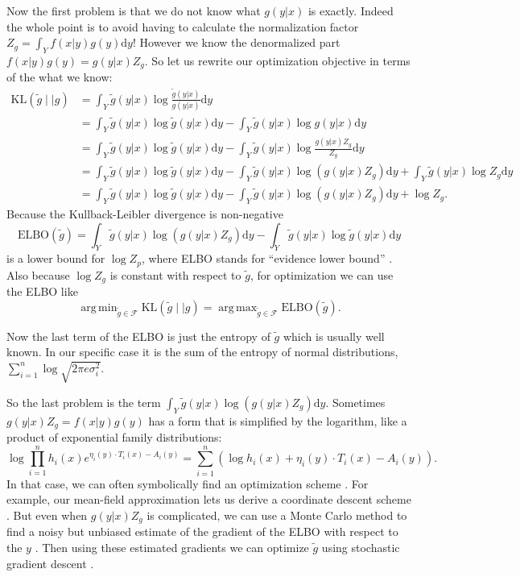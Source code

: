 \documentclass[12pt,vu]{adammath}
\newcommand\kl[2]{{\text{KL}({#1} \mid\mid {#2})}}
\DeclareMathOperator*{\argmin}{arg\,min}
\DeclareMathOperator*{\argmax}{arg\,max}
\theoremstyle{plain}
\theoremstyle{definition}
\theoremstyle{remark}
\begin{document}
Now the first problem is that we do not know what $g(y|x)$ is exactly.
Indeed the whole point is to avoid having to calculate the normalization factor $Z_g = \int_Y f(x|y) g(y) \mathrm{d}y$!
However we know the denormalized part $f(x | y) g(y) = g(y|x) Z_g$.
So let us rewrite our optimization objective in terms of the what we know:
\begin{align*}
  \kl{\tilde{g}}{g} & = \int_Y \tilde{g}(y | x) \log \frac{\tilde{g}(y|x)}{g(y|x)} \mathrm{d}y \\
  &= \int_Y \tilde{g}(y | x) \log \tilde{g}(y|x) \mathrm{d}y - \int_Y \tilde{g}(y | x) \log g(y|x) \mathrm{d}y \\
  &= \int_Y \tilde{g}(y | x) \log \tilde{g}(y|x) \mathrm{d}y - \int_Y \tilde{g}(y | x) \log \frac{g(y|x) Z_g}{Z_g} \mathrm{d}y \\
  &= \int_Y \tilde{g}(y | x) \log \tilde{g}(y|x) \mathrm{d}y - \int_Y \tilde{g}(y | x) \log (g(y|x) Z_g) \mathrm{d}y + \int_Y \tilde{g}(y | x) \log Z_g \mathrm{d}y \\
  &= \int_Y \tilde{g}(y | x) \log \tilde{g}(y|x) \mathrm{d}y - \int_Y \tilde{g}(y | x) \log (g(y|x) Z_g) \mathrm{d}y + \log Z_g.
\end{align*}
Because the Kullback-Leibler divergence is non-negative
$$\text{ELBO}(\tilde{g}) = \int_Y \tilde{g}(y | x) \log (g(y|x) Z_g) \mathrm{d}y - \int_Y \tilde{g}(y | x) \log \tilde{g}(y|x) \mathrm{d}y$$
is a lower bound for $\log Z_p$, where ELBO stands for ``evidence lower bound'' \cite{varinf2016}.
Also because $\log Z_g$ is constant with respect to $\tilde{g}$, for optimization we can use the ELBO like
$$\argmin_{\tilde{g} \in \mathcal{F}} \kl{\tilde{g}}{g} = \argmax_{\tilde{g} \in \mathcal{F}} \text{ELBO}(\tilde{g}).$$

Now the last term of the ELBO is just the entropy of $\tilde{g}$ which is usually well known.
In our specific case it is the sum of the entropy of normal distributions, $\sum_{i=1}^n \log \sqrt{2 \pi e \sigma_i^2}$.

So the last problem is the term $\int_Y \tilde{g}(y | x) \log (g(y|x) Z_g) \mathrm{d}y$.
Sometimes $g(y|x) Z_g = f(x|y) g(y)$ has a form that is simplified by the logarithm, like a product of exponential family distributions:
$$\log \prod_{i=1}^n h_i(x) e^{\eta_i(y) \cdot T_i(x) - A_i(y)} = \sum_{i=1}^n \left( \log h_i(x) + \eta_i(y) \cdot T_i(x) - A_i(y) \right).$$
In that case, we can often symbolically find an optimization scheme \cite{vmp}.
For example, our mean-field approximation lets us derive a coordinate descent scheme \cite{varinf2016}.
But even when $g(y|x) Z_g$ is complicated, we can use a Monte Carlo method to find a noisy but unbiased estimate of the gradient of the ELBO with respect to the $y$ \cite{advi} \cite{bbvi}.
Then using these estimated gradients we can optimize $\tilde{g}$ using stochastic gradient descent \cite{bottou}.
\end{document}
